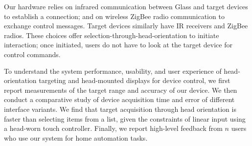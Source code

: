 Our hardware relies on infrared communication between Glass and target devices to establish a connection; and on wireless ZigBee radio communication to exchange control messages.  Target devices similarly have IR receivers and ZigBee radios. These choices offer selection-through-head-orientation to initiate interaction; once initiated, users do not have to look at the target device for control commands.

To understand the system performance, usability, and user experience of head-orientation targeting and head-mounted displays for device control, we first report measurements of the target range and accuracy of our device. We then conduct a comparative study of device acquisition time and error of different interface variants. We find that target acquisition through head orientation is faster than selecting items from a list, given the constraints of linear input using a head-worn touch controller. Finally, we report high-level feedback from $n$ users who use our system for home automation tasks.



